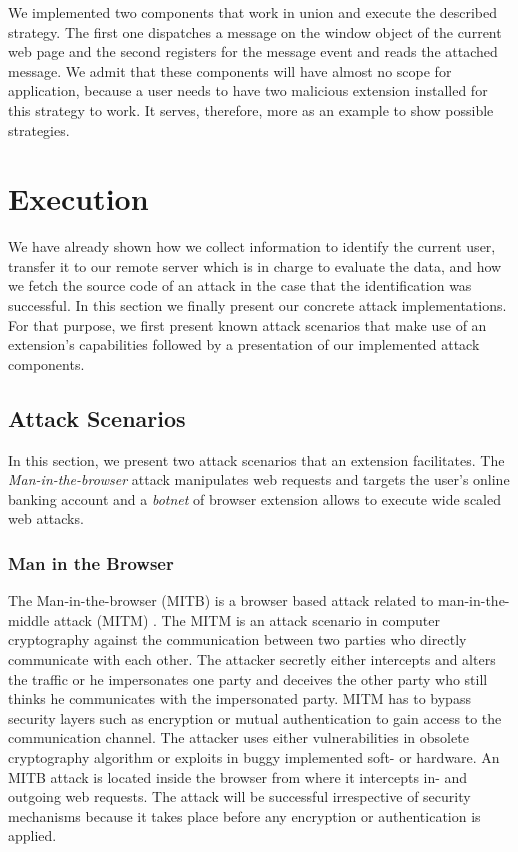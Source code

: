 	We implemented two components that work in union and execute the described strategy. The first one dispatches a message on the window object of the current web page and the second registers for the message event and reads the attached message. We admit that these components will have almost no scope for application, because a user needs to have two malicious extension installed for this strategy to work. It serves, therefore, more as an example to show possible strategies.


\clearpage
\section{Execution}
\label{sec:execution}

	We have already shown how we collect information to identify the current user, transfer it to our remote server which is in charge to evaluate the data, and how we fetch the source code of an attack in the case that the identification was successful. In this section we finally present our concrete attack implementations. For that purpose, we first present known attack scenarios that make use of an extension's capabilities followed by a presentation of our implemented attack components.
	
\subsection{Attack Scenarios}

	In this section, we present two attack scenarios that an extension facilitates. The \textit{Man-in-the-browser} attack manipulates web requests and targets the user's online banking account and a \textit{botnet} of browser extension allows to execute wide scaled web attacks.

\subsubsection{Man in the Browser}
	
	The Man-in-the-browser (MITB) is a browser based attack related to man-in-the-middle attack (MITM) \cite{Curran:2012:MBA:2433195.2433198}. The MITM is an attack scenario in computer cryptography against the communication between two parties who directly communicate with each other. The attacker secretly either intercepts and alters the traffic or he impersonates one party and deceives the other party who still thinks he communicates with the impersonated party. MITM has to bypass security layers such as encryption or mutual authentication to gain access to the communication channel. The attacker uses either vulnerabilities in obsolete cryptography algorithm or exploits in buggy implemented soft- or hardware. An MITB attack is located inside the browser from where it intercepts in- and outgoing web requests. The attack will be successful irrespective of security mechanisms because it takes place before any encryption or authentication is applied. 
	
